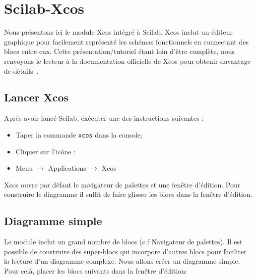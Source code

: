 \newpage
\section{Scilab-Xcos}
Nous présentons ici le module Xcos intégré à Scilab. Xcos inclut un 
éditeur graphique pour facilement représenté les schémas fonctionnels
en connectant des blocs entre eux. Cette présentation/tutoriel étant loin d'être complète,
nous renvoyons le lecteur à la documentation officielle de Xcos pour obtenir davantage de détails~\cite{steer2014scilab,premier,xcos}. 

\subsection{Lancer Xcos}
Après avoir lancé Scilab, éxécuter une des instructions suivantes :
\begin{itemize}
    \item Taper la commande \verb?xcos? dans la console;
    \item Cliquer sur l'icône : 
    \item Menu $\rightarrow$ Applications $\rightarrow$ Xcos
\end{itemize}

Xcos ouvre par défaut le navigateur de palettes et une fenêtre d'édition. 
Pour construire le diagramme il suffit de faire glisser les blocs dans la fenêtre d'édition.

\subsection{Diagramme simple}

Le module inclut un grand nombre de blocs (c.f Navigateur de palettes).
Il est possible de construire des super-blocs qui incorpore d'autres blocs pour faciliter la lecture d'un
diagramme complexe. \newline
Nous allons créer un diagramme simple. Pour celà, placer les blocs suivants dans la fenêtre d'édition:

